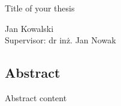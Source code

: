\begin{center}
  \vspace{2.cm}                   
  
  \large {Title of your thesis}
  
  \vspace{0.5 cm}                   
  
  \large{Jan Kowalski}\\
  \large Supervisor: dr inż. Jan Nowak
\end{center}

\subsection*{Abstract}

Abstract content